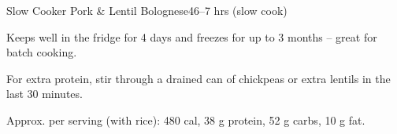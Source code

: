 \begin{recipebox}{Slow Cooker Pork \& Lentil Bolognese}{4}{6--7 hrs (slow cook)}
\begin{notes}
Keeps well in the fridge for 4 days and freezes for up to 3 months -- great for batch cooking.

For extra protein, stir through a drained can of chickpeas or extra lentils in the last 30 minutes.

Approx. per serving (with rice): 480 cal, 38 g protein, 52 g carbs, 10 g fat.
\end{notes}

\end{recipebox}